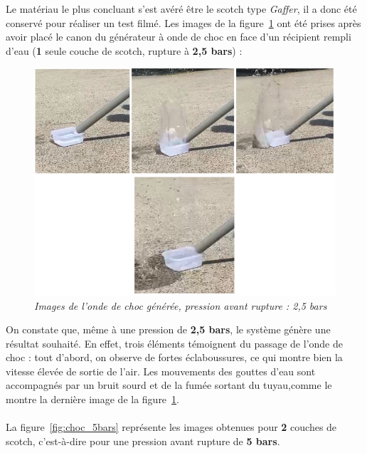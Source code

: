 Le matériau le plus concluant s’est avéré être le scotch type \textit{Gaffer}, il a donc été conservé pour réaliser un test filmé. Les images de la figure~\ref{fig:choc_filmee} ont été prises après avoir placé le canon du générateur à onde de choc en face d’un récipient rempli d’eau (\textbf{1} seule couche de scotch, rupture à \textbf{2,5 bars}) :\\
\begin{figure}[H]
	\centering
	\includegraphics[scale = 0.5]{figures/choc_filmee.png}
	\caption{\small{\textit{Images de l'onde de choc générée, pression avant rupture : 2,5 bars}}}
	\label{fig:choc_filmee}
\end{figure}
On constate que, même à une pression de \textbf{2,5 bars}, le système génère une résultat souhaité. En effet, trois éléments témoignent du passage de l’onde de choc : tout d'abord, on observe de fortes éclaboussures, ce qui montre bien la vitesse élevée de sortie de l'air. Les mouvements des gouttes d'eau sont accompagnés par un bruit sourd et de la fumée sortant du tuyau,comme le montre la dernière image de la figure~\ref{fig:choc_filmee}.\\\\
La figure~\ref{fig:choc_5bars} représente les images obtenues pour \textbf{2} couches de scotch, c'est-à-dire pour une pression avant rupture de \textbf{5 bars}.\\
